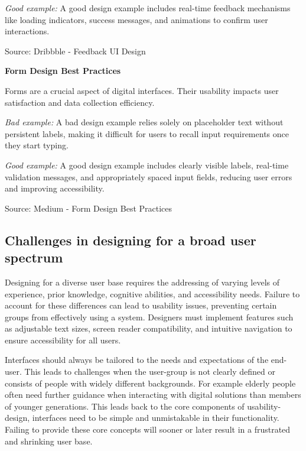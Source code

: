 \blankLine

\textit{Good example:}
A good design example includes real-time feedback mechanisms like loading indicators, success messages, and animations to confirm user interactions.

\blankLine

Source: Dribbble - Feedback UI Design

\blankLine

\textbf{Form Design Best Practices}

Forms are a crucial aspect of digital interfaces. Their usability impacts user satisfaction and data collection efficiency.

\blankLine

\textit{Bad example:}
A bad design example relies solely on placeholder text without persistent labels, making it difficult for users to recall input requirements once they start typing.

\blankLine

\textit{Good example:}
A good design example includes clearly visible labels, real-time validation messages, and appropriately spaced input fields, reducing user errors and improving accessibility.

Source: Medium - Form Design Best Practices

\blankLine

\subsection{Challenges in designing for a broad user spectrum}

Designing for a diverse user base requires the addressing of varying levels of experience, prior knowledge, cognitive abilities, and accessibility needs. Failure to account for these differences can lead to usability issues, preventing certain groups from effectively using a system. Designers must implement features such as adjustable text sizes, screen reader compatibility, and intuitive navigation to ensure accessibility for all users.

\blankLine

Interfaces should always be tailored to the needs and expectations of the end-user. This leads to challenges when the user-group is not clearly defined or consists of people with widely different backgrounds. For example elderly people often need further guidance when interacting with digital solutions than members of younger generations. This leads back to the core components of usability-design, interfaces need to be simple and unmistakable in their functionality. Failing to provide these core concepts will sooner or later result in a frustrated and shrinking user base. 
\autocite{Paul:UIUXIntroduction}

\newpage